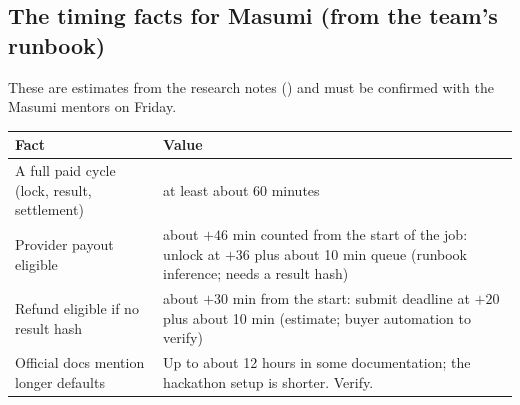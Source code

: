 \subsection{The timing facts for Masumi (from the team's runbook)}
These are estimates from the research notes () and must be confirmed with the Masumi mentors on Friday.

\begin{center}
\small
\begin{tabularx}{\textwidth}{@{}l X@{}}
\toprule
\textbf{Fact} & \textbf{Value}\\
\midrule
A full paid cycle (lock, result, settlement) & at least about 60 minutes\\
Provider payout eligible & about $+46$ min counted from the start of the job: unlock at $+36$ plus about 10 min queue (runbook inference; needs a result hash)\\
Refund eligible if no result hash & about $+30$ min from the start: submit deadline at $+20$ plus about 10 min (estimate; buyer automation to verify)\\
Official docs mention longer defaults & Up to about 12 hours in some documentation; the hackathon setup is shorter. Verify.\\
\bottomrule
\end{tabularx}
\end{center}

\begin{center}
\end{center}

